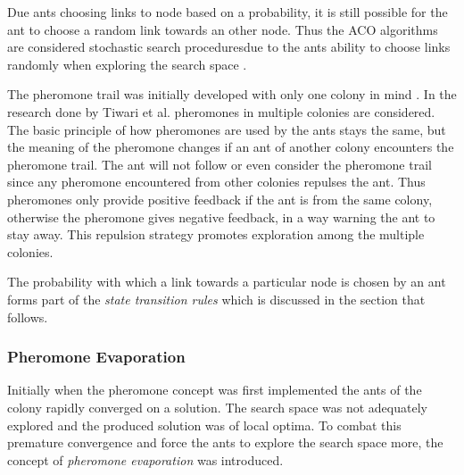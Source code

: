 Due ants choosing links to node based on a probability, it is still possible for the ant to choose a random link towards an other node. Thus the \gls{ACO} algorithms are considered stochastic search proceduresdue to the ants ability to choose links randomly when exploring the search space \cite{ACOSurvey,ImpACOComplex}.

The pheromone trail was initially developed with only one colony in mind \cite{CompuIntelligenceIntro}. In the research done by Tiwari et al.\cite{ACOLargeProblem} pheromones in multiple colonies are considered. The basic principle of how pheromones are used by the ants stays the same, but the meaning of the pheromone changes if an ant of another colony encounters the pheromone trail\cite{AntQAP,AntsAndStigmergy,CompuIntelligenceIntro}. The ant will not follow or even consider the pheromone trail since any pheromone encountered from other colonies repulses the ant\cite{ACOLargeProblem}. Thus pheromones only provide positive feedback if the ant is from the same colony, otherwise the pheromone gives negative feedback, in a way warning the ant to stay away\cite{ACOLargeProblem}. This repulsion strategy promotes exploration among the multiple colonies\cite{ACOLargeProblem}.

The probability with which a link towards a particular node is chosen by an ant forms part of the \emph{state transition rules} which is discussed in the section that follows.

\subsubsection{Pheromone Evaporation}
\label{sec:pheromoneevapuation}
Initially when the pheromone concept was first implemented the ants of the colony rapidly converged on a solution. The search space was not adequately explored and the produced solution was of local optima. To combat this premature convergence and force the ants to explore the search space more, the concept of \emph{pheromone evaporation} was introduced\cite{CompuIntelligenceIntro,AntsAndStigmergy,AntIntroTrends,AntSurvey}. 

